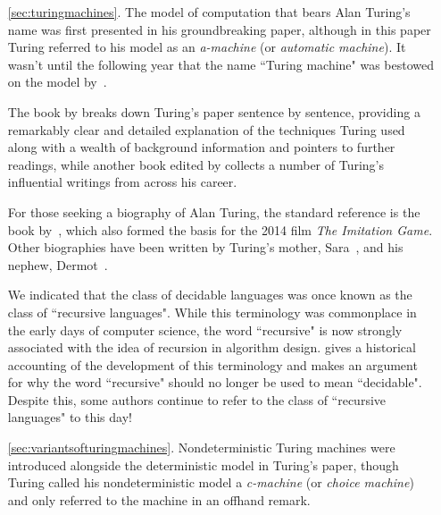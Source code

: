 \begin{enumerate}
\item[\ref{sec:turingmachines}.] The model of computation that bears Alan Turing's name was first presented in his groundbreaking \citeyear{Turing1936OnComputableNumbers} paper, although in this paper Turing  referred to his model as an \emph{a-machine} (or \emph{automatic machine}). It wasn't until the following year that the name ``Turing machine" was bestowed on the model by~\citet{Church1937ReviewTuring}.

The book by \citet{Petzold2008AnnotatedTuring} breaks down Turing's \citeyear{Turing1936OnComputableNumbers} paper sentence by sentence, providing a remarkably clear and detailed explanation of the techniques Turing used along with a wealth of background information and pointers to further readings, while another book edited by \citet{Copeland2004EssentialTuring} collects a number of Turing's influential writings from across his career.

For those seeking a biography of Alan Turing, the standard reference is the book by~\citet{Hodges1983AlanTuringTheEnigma}, which also formed the basis for the 2014 film \textit{The Imitation Game}. Other biographies have been written by Turing's mother, Sara~\citeyearpar{Turing1959AlanMTuring}, and his nephew, Dermot~\citeyearpar{Turing2015ProfAlanTuringDecoded}.

We indicated that the class of decidable languages was once known as the class of ``recursive languages". While this terminology was commonplace in the early days of computer science, the word ``recursive" is now strongly associated with the idea of recursion in algorithm design. \citet{Soare1996ComputabilityAndRecursion} gives a historical accounting of the development of this terminology and makes an argument for why the word ``recursive" should no longer be used to mean ``decidable". Despite this, some authors continue to refer to the class of ``recursive languages" to this day!

\item[\ref{sec:variantsofturingmachines}.] Nondeterministic Turing machines were introduced alongside the deterministic model in Turing's \citeyear{Turing1936OnComputableNumbers} paper, though Turing called his nondeterministic model a \emph{c-machine} (or \emph{choice machine}) and only referred to the machine in an offhand remark.


\end{enumerate}
